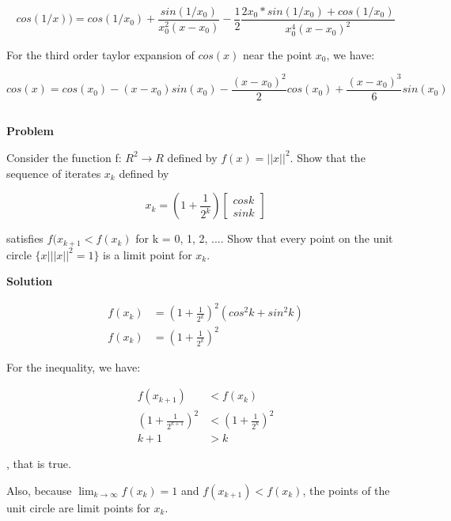 \documentclass[a4paper,11pt]{article}
\numberwithin{equation}{section} %
\begin{document}
\begin{equation}
cos(1/x)) = cos(1/x_0) + \frac{sin(1/x_0)}{x_0^2 (x-x_0)} - \frac{1}{2} \frac{2x_0*sin(1/x_0) + cos(1/x_0)}{x_0^4(x-x_0)^2}
\end{equation}

For the third order taylor expansion of $cos(x)$ near the point $x_0$, we have:

\begin{equation}
    cos(x) = cos(x_0) - (x-x_0)sin(x_0) - \frac{(x-x_0)^2}{2}cos(x_0) + \frac{(x-x_0)^3}{6}sin(x_0)
\end{equation}

\subsection{}

\textbf{Problem}

Consider the function f: $R^2 \rightarrow R$ defined by $f(x) = {||x||}^2$. Show that the sequence of iterates {$x_k$} defined by

\[x_k = (1 + \frac{1}{2^k}) \begin{bmatrix}
    cosk \\ sink
\end{bmatrix}\]

satisfies $f(x_{k+1} < f(x_k)$ for k = 0, 1, 2, .... Show that every point on the unit circle $\{x | {||x||}^2 = 1\}$ is a limit point for {$x_k$}.

\textbf{Solution}

\begin{align}
    f(x_k) &= (1+\frac{1}{2^k})^2(cos^2k + sin^2k) \\
    f(x_k) &= (1+\frac{1}{2^k})^2
\end{align}

For the inequality, we have:

\begin{align}
    f(x_{k+1}) &< f(x_k) \\
    (1 + \frac{1}{2^{k+1}})^2 &< (1 + \frac{1}{2^k})^2 \\ 
    k+1 &> k
\end{align}

, that is true.

Also, because $\lim_{k\to\infty} f(x_k) = 1$ and $f(x_{k+1}) < f(x_k)$, the points of the unit circle are limit points for {$x_k$}.

\subsection{}
\end{document}
